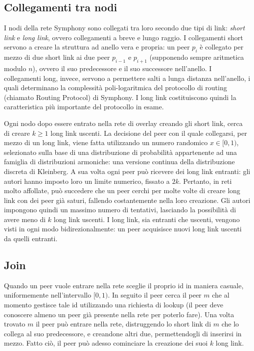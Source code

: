 \documentclass[prodmode,acmtap]{acmlarge}
\begin{document}
\subsection{Collegamenti tra nodi}
I nodi della rete Symphony sono collegati tra loro secondo due tipi di link: \emph{short link} e \emph{long link}, ovvero collegamenti a breve e lungo raggio. I collegamenti short servono a creare la struttura ad anello vera e propria: un peer $p_i$ è collegato per mezzo di due short link ai due peer $p_{i-1}$ e $p_{i+1}$ (supponendo sempre aritmetica modulo $n$), ovvero il suo predecessore e il suo successore nell'anello. I collegamenti long, invece, servono a permettere salti a lunga distanza nell'anello, i quali determinano la complessità poli-logaritmica del protocollo di routing (chiamato Routing Protocol) di Symphony. I long link costituiscono quindi la caratteristica più importante del protocollo in esame.

Ogni nodo dopo essere entrato nella rete di overlay creando gli short link, cerca di creare $k \ge 1$ long link uscenti. La decisione del peer con il quale collegarsi, per mezzo di un long link, viene fatta utilizzando un numero randomico $x \in [0,1)$, selezionato sulla base di una distribuzione di probabilità appartenente ad una famiglia di distribuzioni armoniche: una versione continua della distribuzione discreta di Kleinberg. A sua volta ogni peer può ricevere dei long link entranti: gli autori hanno imposto loro un limite numerico, fissato a $2k$. Pertanto, in reti molto affollate, può succedere che un peer cerchi per molte volte di creare long link con dei peer già saturi, fallendo costantemente nella loro creazione. Gli autori impongono quindi un massimo numero di tentativi, lasciando la possibilità di avere meno di $k$ long link uscenti. I long link, sia entranti che uscenti, vengono visti in ogni modo bidirezionalmente: un peer acquisisce nuovi long link uscenti da quelli entranti.

\subsection{Join}
Quando un peer vuole entrare nella rete sceglie il proprio id in maniera casuale, uniformemente nell'intervallo $[0,1)$. In seguito il peer cerca il peer $m$ che al momento gestisce tale id utilizzando una richiesta di lookup (il peer deve conoscere almeno un peer già presente nella rete per poterlo fare). Una volta trovato $m$ il peer può entrare nella rete, distruggendo lo short link di $m$ che lo collega al suo predecessore, e creandone altri due, permettendogli di inserirsi in mezzo. Fatto ciò, il peer può adesso cominciare la creazione dei suoi $k$ long link.
\end{document}
